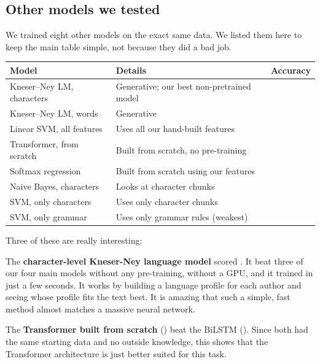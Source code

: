 \subsection{Other models we tested}
\label{sec:alsoran}

We trained eight other models on the exact same data. We listed them here to keep the main table simple, not because they did a bad job.

\begin{center}\small
\begin{tabular}{llr}
\toprule
\textbf{Model} & \textbf{Details} & \textbf{Accuracy} \\
\midrule
Kneser--Ney LM, characters   & Generative; our best non-pretrained model & \genCharAcc{} \\
Kneser--Ney LM, words        & Generative                            & \genWordAcc{} \\
Linear SVM, all features     & Uses all our hand-built features      & \svmAllAcc{} \\
Transformer, from scratch   & Built from scratch, no pre-training   & \transScratchAcc{} \\
Softmax regression          & Built from scratch using our features & \softmaxAcc{} \\
Naive Bayes, characters     & Looks at character chunks             & \naiveBayesCharAcc{} \\
SVM, only characters        & Uses only character chunks            & \svmCharAcc{} \\
SVM, only grammar           & Uses only grammar rules (weakest)     & \svmPosAcc{} \\
\bottomrule
\end{tabular}
\end{center}

Three of these are really interesting:

The \textbf{character-level Kneser-Ney language model} scored \genCharAcc{}. It beat three of our four main models without any pre-training, without a GPU, and it trained in just a few seconds. It works by building a language profile for each author and seeing whose profile fits the text best. It is amazing that such a simple, fast method almost matches a massive neural network.

The \textbf{Transformer built from scratch} (\transScratchAcc{}) beat the BiLSTM (\bilstmAcc{}). Since both had the same starting data and no outside knowledge, this shows that the Transformer architecture is just better suited for this task.

